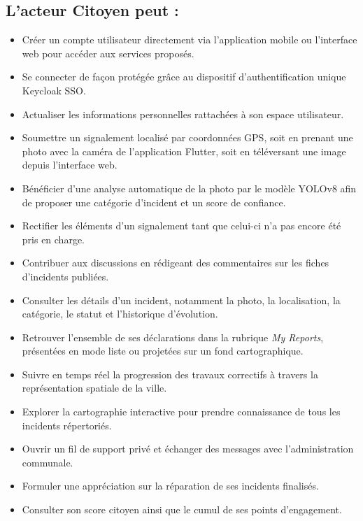 \subsection{L'acteur Citoyen peut :}
\begin{itemize}
    \item Créer un compte utilisateur directement via l'application mobile ou l'interface web pour accéder aux services proposés.
    \item Se connecter de façon protégée grâce au dispositif d'authentification unique Keycloak SSO.
    \item Actualiser les informations personnelles rattachées à son espace utilisateur.
    \item Soumettre un signalement localisé par coordonnées GPS, soit en prenant une photo avec la caméra de l'application Flutter, soit en téléversant une image depuis l'interface web.
    \item Bénéficier d'une analyse automatique de la photo par le modèle YOLOv8 afin de proposer une catégorie d'incident et un score de confiance.
    \item Rectifier les éléments d'un signalement tant que celui-ci n'a pas encore été pris en charge.
    \item Contribuer aux discussions en rédigeant des commentaires sur les fiches d'incidents publiées.
    \item Consulter les détails d'un incident, notamment la photo, la localisation, la catégorie, le statut et l'historique d'évolution.
    \item Retrouver l'ensemble de ses déclarations dans la rubrique \textit{My Reports}, présentées en mode liste ou projetées sur un fond cartographique.
    \item Suivre en temps réel la progression des travaux correctifs à travers la représentation spatiale de la ville.
    \item Explorer la cartographie interactive pour prendre connaissance de tous les incidents répertoriés.
    \item Ouvrir un fil de support privé et échanger des messages avec l'administration communale.
    \item Formuler une appréciation sur la réparation de ses incidents finalisés.
    \item Consulter son score citoyen ainsi que le cumul de ses points d'engagement.
\end{itemize}

